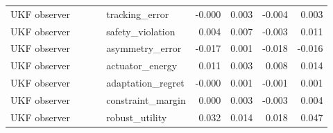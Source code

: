 \documentclass{article}
\begin{document}
\begin{center}
\begin{longtable}{p{0.31\linewidth}p{0.23\linewidth}rrrr}
UKF observer & tracking\_error & -0.000 & 0.003 & -0.004 & 0.003\\
UKF observer & safety\_violation & 0.004 & 0.007 & -0.003 & 0.011\\
UKF observer & asymmetry\_error & -0.017 & 0.001 & -0.018 & -0.016\\
UKF observer & actuator\_energy & 0.011 & 0.003 & 0.008 & 0.014\\
UKF observer & adaptation\_regret & -0.000 & 0.001 & -0.001 & 0.001\\
UKF observer & constraint\_margin & 0.000 & 0.003 & -0.003 & 0.004\\
UKF observer & robust\_utility & 0.032 & 0.014 & 0.018 & 0.047\\
\bottomrule
\end{longtable}
\normalsize
\end{center}
\end{document}
